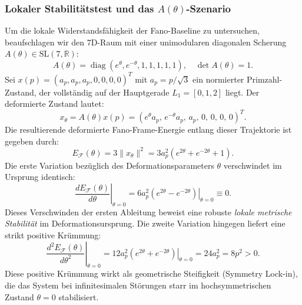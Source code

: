 \documentclass[11pt,a4paper]{article}
\theoremstyle{definition}
\begin{document}
	\subsubsection{Lokaler Stabilitätstest und das $A(\theta)$-Szenario}
	Um die lokale Widerstandsfähigkeit der Fano-Baseline zu untersuchen, beaufschlagen wir den 7D-Raum mit einer unimodularen diagonalen Scherung $A(\theta) \in \mathrm{SL}(7, \mathbb{R})$:
	\begin{equation}
		A(\theta) = \operatorname{diag}\left(e^\theta, e^{-\theta}, 1, 1, 1, 1, 1\right), \quad \det A(\theta) = 1.
	\end{equation}
	Sei $x(p) = (a_p, a_p, a_p, 0, 0, 0, 0)^T$ mit $a_p = p/\sqrt{3}$ ein normierter Primzahl-Zustand, der vollständig auf der Hauptgerade $L_1 = [0, 1, 2]$ liegt. Der deformierte Zustand lautet:
	\begin{equation}
		x_\theta = A(\theta)x(p) = \left(e^\theta a_p, \, e^{-\theta} a_p, \, a_p, \, 0, \, 0, \, 0, \, 0\right)^T.
	\end{equation}
	Die resultierende deformierte Fano-Frame-Energie entlang dieser Trajektorie ist gegeben durch:
	\begin{equation}
		E_{\mathcal{F}}(\theta) = 3 \|x_\theta\|^2 = 3 a_p^2 \left(e^{2\theta} + e^{-2\theta} + 1\right).
	\end{equation}
	Die erste Variation bezüglich des Deformationsparameters $\theta$ verschwindet im Ursprung identisch:
	\begin{equation}
		\left. \frac{d E_{\mathcal{F}}(\theta)}{d\theta} \right|_{\theta = 0} = 6 a_p^2 \left.\left(e^{2\theta} - e^{-2\theta}\right)\right|_{\theta=0} \equiv 0.
	\end{equation}
	Dieses Verschwinden der ersten Ableitung beweist eine robuste \emph{lokale metrische Stabilität} im Deformationsursprung. Die zweite Variation hingegen liefert eine strikt positive Krümmung:
	\begin{equation}
		\left. \frac{d^2 E_{\mathcal{F}}(\theta)}{d\theta^2} \right|_{\theta = 0} = 12 a_p^2 \left.\left(e^{2\theta} + e^{-2\theta}\right)\right|_{\theta=0} = 24 a_p^2 = 8p^2 > 0.
	\end{equation}
	Diese positive Krümmung wirkt als geometrische Steifigkeit (Symmetry Lock-in), die das System bei infinitesimalen Störungen starr im hochsymmetrischen Zustand $\theta = 0$ stabilisiert.
	
\end{document}
